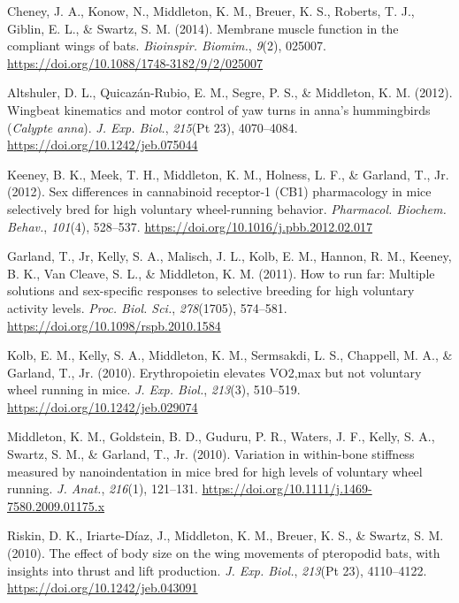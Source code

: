 \documentclass[11pt, a4paper]{awesome-cv}
\begin{document}
\leavevmode\hypertarget{ref-cheney_membrane_2014}{}%
Cheney, J. A., Konow, N., Middleton, K. M., Breuer, K. S., Roberts, T.
J., Giblin, E. L., \& Swartz, S. M. (2014). Membrane muscle function in
the compliant wings of bats. \emph{Bioinspir. Biomim.}, \emph{9}(2),
025007. \url{https://doi.org/10.1088/1748-3182/9/2/025007}

\leavevmode\hypertarget{ref-altshuler_wingbeat_2012}{}%
Altshuler, D. L., Quicazán-Rubio, E. M., Segre, P. S., \& Middleton, K.
M. (2012). Wingbeat kinematics and motor control of yaw turns in anna's
hummingbirds (\emph{Calypte anna}). \emph{J. Exp. Biol.}, \emph{215}(Pt
23), 4070--4084. \url{https://doi.org/10.1242/jeb.075044}

\leavevmode\hypertarget{ref-keeney_sex_2012}{}%
Keeney, B. K., Meek, T. H., Middleton, K. M., Holness, L. F., \&
Garland, T., Jr. (2012). Sex differences in cannabinoid receptor-1 (CB1)
pharmacology in mice selectively bred for high voluntary wheel-running
behavior. \emph{Pharmacol. Biochem. Behav.}, \emph{101}(4), 528--537.
\url{https://doi.org/10.1016/j.pbb.2012.02.017}

\leavevmode\hypertarget{ref-garlandjr_how_2011}{}%
Garland, T., Jr, Kelly, S. A., Malisch, J. L., Kolb, E. M., Hannon, R.
M., Keeney, B. K., Van Cleave, S. L., \& Middleton, K. M. (2011). How to
run far: Multiple solutions and sex-specific responses to selective
breeding for high voluntary activity levels. \emph{Proc. Biol. Sci.},
\emph{278}(1705), 574--581. \url{https://doi.org/10.1098/rspb.2010.1584}

\leavevmode\hypertarget{ref-kolb_erythropoietin_2010}{}%
Kolb, E. M., Kelly, S. A., Middleton, K. M., Sermsakdi, L. S., Chappell,
M. A., \& Garland, T., Jr. (2010). Erythropoietin elevates VO2,max but
not voluntary wheel running in mice. \emph{J. Exp. Biol.},
\emph{213}(3), 510--519. \url{https://doi.org/10.1242/jeb.029074}

\leavevmode\hypertarget{ref-middleton_variation_2010}{}%
Middleton, K. M., Goldstein, B. D., Guduru, P. R., Waters, J. F., Kelly,
S. A., Swartz, S. M., \& Garland, T., Jr. (2010). Variation in
within-bone stiffness measured by nanoindentation in mice bred for high
levels of voluntary wheel running. \emph{J. Anat.}, \emph{216}(1),
121--131. \url{https://doi.org/10.1111/j.1469-7580.2009.01175.x}

\leavevmode\hypertarget{ref-riskin_effect_2010}{}%
Riskin, D. K., Iriarte-Díaz, J., Middleton, K. M., Breuer, K. S., \&
Swartz, S. M. (2010). The effect of body size on the wing movements of
pteropodid bats, with insights into thrust and lift production. \emph{J.
Exp. Biol.}, \emph{213}(Pt 23), 4110--4122.
\url{https://doi.org/10.1242/jeb.043091}
\end{document}
